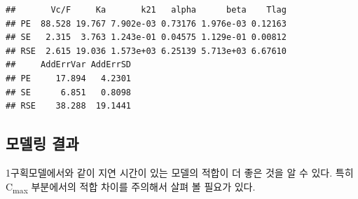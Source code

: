 \documentclass[
  11pt,
  krantz2, a4paper, twoside]{krantz}
\newenvironment{Shaded}{\begin{snugshade}}{\end{snugshade}}
\newcommand{\AttributeTok}[1]{\textcolor[rgb]{0.77,0.63,0.00}{#1}}
\newcommand{\DecValTok}[1]{\textcolor[rgb]{0.00,0.00,0.81}{#1}}
\newcommand{\FunctionTok}[1]{\textcolor[rgb]{0.00,0.00,0.00}{#1}}
\newcommand{\NormalTok}[1]{#1}
\newcommand{\OtherTok}[1]{\textcolor[rgb]{0.56,0.35,0.01}{#1}}
\newcommand{\SpecialCharTok}[1]{\textcolor[rgb]{0.00,0.00,0.00}{#1}}
\newcommand{\StringTok}[1]{\textcolor[rgb]{0.31,0.60,0.02}{#1}}
\theoremstyle{definition}
\theoremstyle{definition}
\theoremstyle{definition}
\theoremstyle{definition}
\theoremstyle{remark}
\begin{document}
\begin{verbatim}
##       Vc/F     Ka       k21   alpha      beta    Tlag
## PE  88.528 19.767 7.902e-03 0.73176 1.976e-03 0.12163
## SE   2.315  3.763 1.243e-01 0.04575 1.129e-01 0.00812
## RSE  2.615 19.036 1.573e+03 6.25139 5.713e+03 6.67610
##     AddErrVar AddErrSD
## PE     17.894   4.2301
## SE      6.851   0.8098
## RSE    38.288  19.1441
\end{verbatim}

\hypertarget{uxbaa8uxb378uxb9c1-uxacb0uxacfc-2}{%
\subsection{모델링 결과}\label{uxbaa8uxb378uxb9c1-uxacb0uxacfc-2}}

1구획모델에서와 같이 지연 시간이 있는 모델의 적합이 더 좋은 것을 알 수 있다. 특히 C\textsubscript{max} 부분에서의 적합 차이를 주의해서 살펴 볼 필요가 있다.

\begin{Shaded}
\end{Shaded}
\end{document}
